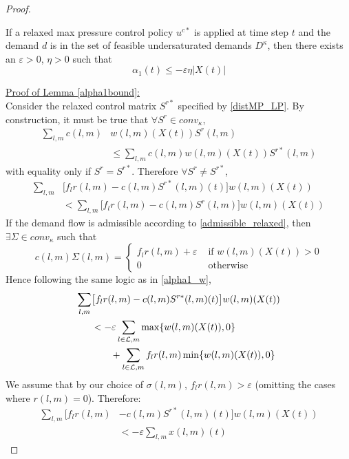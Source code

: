 \begin{proof}
 \begin{Lem} \label{alpha1bound}
If a relaxed max pressure control policy $u^{c*}$ is applied at time step $t$ and the demand $d$ is in the set of feasible undersaturated demands $D^\kappa$, then there exists an $\varepsilon>0$, $\eta>0$ such that 
\begin{equation} 
\alpha_1(t)  \leq -\varepsilon \eta \big| X(t)\big| 
\end{equation}
\end{Lem}
\underline{Proof of Lemma \ref{alpha1bound}:} \\
Consider the relaxed control matrix $S^{r*}$ specified by \eqref{distMP_LP}. By construction, it must be true that $ \forall S^r \in conv_{\kappa}$, 
\begin{align} \nonumber
\sum_{l,m}c(l,m)& w(l,m)(X(t))S^r (l,m) \\
&\leq \sum_{l,m}c(l,m)w(l,m)(X(t))S^{r*}(l,m) 
\end{align}
with equality only if $S^r = S^{r*}$. 
Therefore $\forall S^r \neq S^{r*}$,
\begin{align} \nonumber
 \sum_{l,m}&\big[f_{l}r(l,m) - c(l,m)S^{r*}(l,m)(t)\big]w(l,m)(X(t)) \\
&<   \sum_{l,m}\big[f_{l}r(l,m) - c(l,m)S^r(l,m)\big]w(l,m)(X(t))
\end{align}
If the demand flow is admissible according to \eqref{admissible_relaxed}, then 
$\exists \Sigma \in conv_{\kappa}$ such that 
\begin{equation} \nonumber
c(l,m)\Sigma(l,m) = \begin{cases}
        f_{l}r(l,m) + \varepsilon & \text{ if } w(l,m)(X(t)) > 0 \\
        0 & \text{ otherwise}
    \end{cases}
\end{equation}
{\color{red} Hence following the same logic as in \eqref{alpha1_w}, }
\begin{align} \nonumber
 \sum_{l,m}&\big[f_{l}r(l,m) -  c(l,m)S^{r*}(l,m)(t)\big] w(l,m)(X(t))  \\ \nonumber
&  < -\varepsilon \sum_{l \in \mathcal{L},m} \max\{w(l,m)(X(t)) ,0\} \\
&\qquad +  \sum_{l \in \mathcal{L},m}  f_l r(l,m)  \min\{ w(l,m)(X(t)) ,0\}
\end{align}
We assume that by our choice of $\sigma(l,m)$, $f_{l}r(l,m) > \varepsilon$ (omitting the cases where $r(l,m) = 0$). Therefore:
\begin{align}\nonumber
\sum_{l,m}\big[ f_{l}r(l,m) & - c(l,m)S^{r*}(l,m)(t)\big]w(l,m)(X(t)) \\
&< -\varepsilon \displaystyle\sum_{l,m} x(l,m)(t)
\end{align}


\end{proof}

